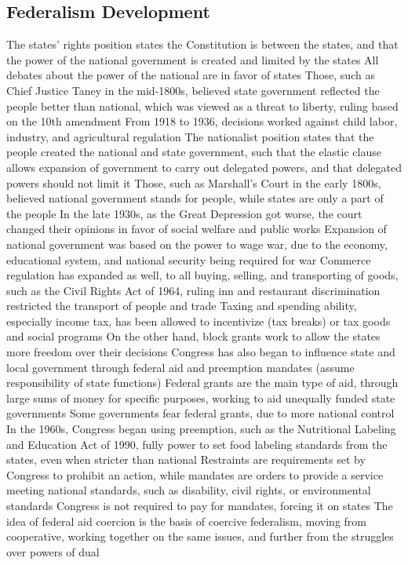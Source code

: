 \documentclass[11 pt, twoside]{article}
\newenvironment{outline*}
{
	\begin{outline}[enumerate]
	}
	{\end{outline}
}
\begin{document}
\subsection{Federalism Development}
\begin{outline*}
\1 The states’ rights position states the Constitution is between the states, and that the power of the national government is created and limited by the states
\2 All debates about the power of the national are in favor of states
\2 Those, such as Chief Justice Taney in the mid-1800s, believed state government reflected the people better than national, which was viewed as a threat to liberty, ruling based on the 10th amendment
\2 From 1918 to 1936, decisions worked against child labor, industry, and agricultural regulation
\1 The nationalist position states that the people created the national and state government, such that the elastic clause allows expansion of government to carry out delegated powers, and that delegated powers should not limit it
\2 Those, such as Marshall’s Court in the early 1800s, believed national government stands for people, while states are only a part of the people
\2 In the late 1930s, as the Great Depression got worse, the court changed their opinions in favor of social welfare and public works
\1 Expansion of national government was based on the power to wage war, due to the economy, educational system, and national security being required for war
\2 Commerce regulation has expanded as well, to all buying, selling, and transporting of goods, such as the Civil Rights Act of 1964, ruling inn and restaurant discrimination restricted the transport of people and trade
\2 Taxing and spending ability, especially income tax, has been allowed to incentivize (tax breaks) or tax goods and social programs
\2 On the other hand, block grants work to allow the states more freedom over their decisions
\1 Congress has also began to influence state and local government through federal aid and preemption mandates (assume responsibility of state functions)
\2 Federal grants are the main type of aid, through large sums of money for specific purposes, working to aid unequally funded state governments
\2 Some governments fear federal grants, due to more national control
\2 In the 1960s, Congress began using preemption, such as the Nutritional Labeling and Education Act of 1990, fully power to set food labeling standards from the states, even when stricter than national
\2 Restraints are requirements set by Congress to prohibit an action, while mandates are orders to provide a service meeting national standards, such as disability, civil rights, or environmental standards
\2 Congress is not required to pay for mandates, forcing it on states
\2 The idea of federal aid coercion is the basis of coercive federalism, moving from cooperative, working together on the same issues, and further from the struggles over powers of dual
\end{outline*}
\end{document}
